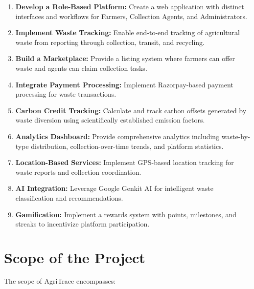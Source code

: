 \documentclass[a4paper,12pt,oneside]{report}
\let\originalitem\item
\renewcommand{\item}{\Needspace{10\baselineskip}\originalitem}
\begin{document}
\begin{enumerate}
    \item \textbf{Develop a Role-Based Platform:} Create a web application with distinct interfaces and workflows for Farmers, Collection Agents, and Administrators.

    \item \textbf{Implement Waste Tracking:} Enable end-to-end tracking of agricultural waste from reporting through collection, transit, and recycling.

    \item \textbf{Build a Marketplace:} Provide a listing system where farmers can offer waste and agents can claim collection tasks.

    \item \textbf{Integrate Payment Processing:} Implement Razorpay-based payment processing for waste transactions.

    \item \textbf{Carbon Credit Tracking:} Calculate and track carbon offsets generated by waste diversion using scientifically established emission factors.

    \item \textbf{Analytics Dashboard:} Provide comprehensive analytics including waste-by-type distribution, collection-over-time trends, and platform statistics.

    \item \textbf{Location-Based Services:} Implement GPS-based location tracking for waste reports and collection coordination.

    \item \textbf{AI Integration:} Leverage Google Genkit AI for intelligent waste classification and recommendations.

    \item \textbf{Gamification:} Implement a rewards system with points, milestones, and streaks to incentivize platform participation.
\end{enumerate}

\section{Scope of the Project}

\noindent The scope of AgriTrace encompasses:
\end{document}

